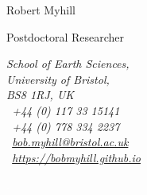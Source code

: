 \documentclass[11pt,twoside,a4paper]{article}
\date{}
\title{}
\newcommand*{\mobilesymbol}{\Mobilefone~}
\newcommand*{\phonesymbol}{\Telefon~}
\newcommand*{\emailsymbol}{\Letter~}
\newcommand*{\homepagesymbol}{{\Large\ComputerMouse}~}
\begin{document}

\vspace{-5em}

\begin{center}
\begin{minipage}[b]{0.53\textwidth}
  \raggedright
  \Huge{Robert Myhill} \par
  \LARGE{\color{color1} Postdoctoral Researcher} \par
  \vspace{0.5em}
\end{minipage}%
\begin{minipage}[b]{0.33\textwidth}
  \raggedleft
  \scriptsize \it \color{gray}
  School of Earth Sciences, \\
  University of Bristol, \\
  BS8 1RJ, UK\\
  \phonesymbol +44 (0) 117 33 15141 \\
  \mobilesymbol +44 (0) 778 334 2237 \\
  \emailsymbol \href{mailto:bob.myhill@bristol.ac.uk}{bob.myhill@bristol.ac.uk} \\
  \homepagesymbol \url{https://bobmyhill.github.io}\\
\end{minipage}%
\begin{minipage}[b]{0.02\textwidth}
  \raggedleft \textcolor{white}{.}
\end{minipage}%
\begin{minipage}[b]{0.12\textwidth}
  \raggedleft
      {%
        \color{color1}
        \setlength{\fboxsep}{1.pt}%
        \setlength{\fboxrule}{0.8pt}%
}
\end{minipage}
\end{center}
\end{document}
